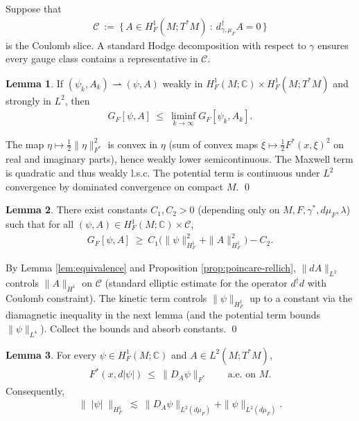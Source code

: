 \documentclass[fleqn,11pt,twoside]{article}
\makeatletter
\renewenvironment{proof}[1][\proofname]{\par
  \normalfont
  \topsep6\p@\@plus6\p@ \trivlist
  \item[\hskip\labelsep\textbf{%
    #1\@addpunct{.}}]\ignorespaces
}{%
  \qed\endtrivlist
}
\theoremstyle{definition}
\newtheorem{lemma}{Lemma}
\makeatother
\begin{document}
Suppose that
\begin{align*}
  \mathcal{C}\ :=\ \{\, A\in H^1_F(M;T^*M)\ :\ d^\dagger_{\gamma,\mu_F}A=0 \,\}
\end{align*}
is the Coulomb slice. A standard Hodge decomposition with respect to $\gamma$ ensures every gauge class contains a representative in $\mathcal{C}$.

\begin{lemma}\label{lem:lsc}
If $(\psi_k,A_k)\rightharpoonup (\psi,A)$ weakly in $H^1_F(M;\mathbb{C})\times H^1_F(M;T^*M)$
and strongly in $L^2$, then
\begin{align*}
G_F[\psi,A]\ \le\ \liminf_{k\to\infty} G_F[\psi_k,A_k].
\end{align*}
\end{lemma}

\begin{proof}
The map $\eta\mapsto \tfrac 12 \|\eta\|_{F^*}^2$ is convex in $\eta$ (sum of convex maps
$\xi\mapsto \tfrac 12 F^*(x,\xi)^2$ on real and imaginary parts), hence weakly lower
semicontinuous. The Maxwell term is quadratic and thus weakly l.s.c. The potential term is continuous under $L^2$ convergence by dominated convergence on compact $M$.
\end{proof}

\begin{lemma}\label{lem:coercive-slice}
There exist constants $C_1,C_2>0$ (depending only on $M,F,\gamma^*,d\mu_F,\lambda$) such that
for all $(\psi,A)\in H^1_F(M;\mathbb{C})\times\mathcal{C}$,
\begin{align*}
G_F[\psi,A]\ \ge\ C_1\Big( \|\psi\|_{H^1_F}^2 + \|A\|_{H^1_F}^2 \Big) - C_2.
\end{align*}
\end{lemma}

\begin{proof}
By Lemma \ref{lem:equivalence} and  Proposition \ref{prop:poincare-rellich}, $\|dA\|_{L^2}$ controls $\|A\|_{H^1}$ on $\mathcal{C}$ (standard elliptic estimate for the operator $d^\dagger d$ with Coulomb constraint). The kinetic term controls $\|\psi\|_{H^1_F}$ up to a constant via the diamagnetic inequality in the next lemma (and the potential term bounds $\|\psi\|_{L^4}$). Collect the bounds and absorb constants.
\end{proof}

\begin{lemma}\label{lem:diamagnetic}
For every $\psi\in H^1_F(M;\mathbb{C})$ and $A\in L^2(M;T^*M)$,
\begin{align*}
 F^*(x, d|\psi|)\ \le\ \|D_A\psi\|_{F^*}\qquad \text{a.e.\ on }M.
\end{align*}
Consequently,
\begin{align*}
\|\;|\psi|\;\|_{H^1_F}\ \lesssim\ \|D_A\psi\|_{L^2(d\mu_F)} + \|\psi\|_{L^2(d\mu_F)}.  
\end{align*}
\end{lemma}
\end{document}
